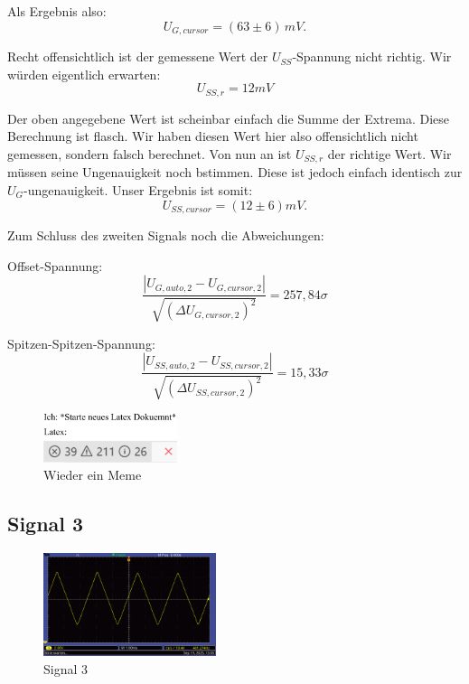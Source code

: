 Als Ergebnis also:
\begin{equation}
\boxed{
    U_{G,cursor} = (63 \pm 6) \, mV
}.
\end{equation}

Recht offensichtlich ist der gemessene Wert der $U_{SS}$-Spannung nicht richtig. Wir würden eigentlich erwarten:
\begin{equation}
    U_{SS,r} = 12 mV
\end{equation}

Der oben angegebene Wert ist scheinbar einfach die Summe der Extrema. Diese Berechnung ist flasch. Wir haben diesen Wert hier also offensichtlich nicht gemessen, sondern falsch berechnet. Von nun an ist $U_{SS,r}$ der richtige Wert.
Wir müssen seine Ungenauigkeit noch bstimmen. Diese ist jedoch einfach identisch zur $U_G$-ungenauigkeit. Unser Ergebnis ist somit:
\begin{equation}
    \boxed{
        U_{SS,cursor} = (12 \pm 6) mV
    }.
\end{equation}

Zum Schluss des zweiten Signals noch die Abweichungen:

Offset-Spannung:
\begin{equation}
    \frac{\left| U_{G,auto,2} - U_{G,cursor,2} \right|}{\sqrt{(\Delta U_{G,cursor,2})^2}} = 257,84\sigma
\end{equation}

Spitzen-Spitzen-Spannung:
\begin{equation}
    \frac{\left| U_{SS,auto,2} - U_{SS,cursor,2} \right|}{\sqrt{(\Delta U_{SS,cursor,2})^2}} = 15,33\sigma
\end{equation}

\begin{figure}[t]
    \centering
    \includegraphics[width=0.35\textwidth]{img/25/memes/latexErrors.pdf}
    \caption{Wieder ein Meme}
\end{figure}

\newpage
\onecolumn
\twocolumn

\subsection*{Signal 3}
\begin{figure} [h!]
    \centering
        \includegraphics[width=0.45\textwidth]{img/25/Signale2/Signal3.pdf}
    \caption{Signal 3}
\end{figure}

